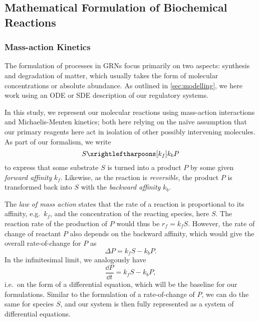 \subsection[Mathematical Formulation]{Mathematical Formulation of Biochemical
  Reactions}

\subsubsection[Mass-action Kinetics]{Mass-action Kinetics}
The formulation of processes in GRNs focus primarily on two aspects: synthesis
and degradation of matter, which usually takes the form of molecular
concentrations or absolute abundance. As outlined in \cref{sec:modelling}, we
here work using an ODE or SDE description of  
our regulatory systems. 

In this study, we represent our molecular reactions using mass-action
interactions and Michaelis-Menten kinetics; both here relying on the na\"ive
assumption that our primary reagents here act in isolation of other possibly
intervening molecules. As part of our formalism, we write
\begin{equation}
  S \xrightleftharpoons[k_{f}]{k_{b}} P
  \label{eq:simple_reac}
\end{equation}
to express that some substrate $S$ is turned into a product $P$ by some given
\textit{forward affinity} $k_f$. Likewise, as the reaction is \textit{reversible}, the
product $P$ is transformed back into $S$ with the \textit{backward affinity}
$k_b$. 

The \textit{law of mass action} states that the rate of a reaction
is proportional to its affinity, e.g.\ $k_f$, and the concentration of the
reacting species, here $S$. The reaction rate of the production of $P$ would thus be
$r_f = k_f S$. However, the rate of change of reactant $P$ also depends
on the backward affinity, which would give the overall rate-of-change for $P$ as
\begin{equation}
  \Delta P = k_f S - k_b P.
  \label{eq:mass_action_noninf}
\end{equation}
In the infinitesimal limit, we analogously have 
\begin{equation}
  \frac{\dd P}{\dd t} = k_f S - k_b P,
  \label{eq:mass_action_inf}
\end{equation}
i.e.\ on the form of a differential equation, which will be the baseline for our
formulations. Similar to the formulation of a rate-of-change of $P$, we can do the
same for species $S$, and our system is then fully represented as a system of
differential equations.


